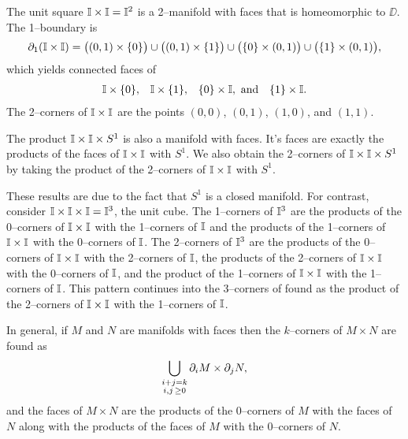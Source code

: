 \begin{ex}
	The unit square $\mathbb{I}\times \mathbb{I}=\mathbb{I}^2$ is a 2--manifold with faces that is homeomorphic to $\DD$.
	The 1--boundary is 
	\[\partial_1(\mathbb{I}\times\mathbb{I}) = \big((0,1)\times\{0\}\big)\cup\big((0,1)\times\{1\}\big)\cup\big(\{0\}\times(0,1)\big)\cup\big(\{1\}\times(0,1)\big),\]
	which yields connected faces of
	\[
		\begin{array}{cccc}
			\mathbb{I}\times\{0\}, & \mathbb{I}\times\{1\}, & \{0\}\times\mathbb{I}, \textmd{ and}&\{1\}\times\mathbb{I}.
		\end{array}
	\]
	The 2--corners of $\mathbb{I}\times\mathbb{I}$ are the points $(0,0)$, $(0,1)$, $(1,0)$, and $(1,1)$.

	The product $\mathbb{I}\times\mathbb{I}\times S^1$ is also a manifold with faces.
	It's faces are exactly the products of the faces of $\mathbb{I}\times\mathbb{I}$ with $S^1$.
	We also obtain the 2--corners of $\mathbb{I}\times\mathbb{I}\times S^1$ by taking the product of the 2--corners of $\mathbb{I}\times\mathbb{I}$ with $S^1$.
	
	These results are due to the fact that $S^1$ is a closed manifold.
	For contrast, consider $\mathbb{I}\times\mathbb{I}\times\mathbb{I}=\mathbb{I}^3$, the unit cube.
	The 1--corners of $\mathbb{I}^3$ are the products of the 0--corners of $\mathbb{I}\times\mathbb{I}$ with the 1--corners of $\mathbb{I}$ and the products of the 1--corners of $\mathbb{I}\times\mathbb{I}$ with the 0--corners of $\mathbb{I}$.
	The 2--corners of $\mathbb{I}^3$ are the products of the 0--corners of $\mathbb{I}\times\mathbb{I}$ with the 2--corners of $\mathbb{I}$, the products of the 2--corners of $\mathbb{I}\times\mathbb{I}$ with the 0--corners of $\mathbb{I}$, and the product of the 1--corners of $\mathbb{I}\times\mathbb{I}$ with the 1--corners of $\mathbb{I}$.
	This pattern continues into the 3--corners of found as the product  of the 2--corners of $\mathbb{I}\times\mathbb{I}$ with the 1--corners of $\mathbb{I}$.
	
	In general, if $M$ and $N$ are manifolds with faces then the $k$--corners of $M\times N$ are found as
	\[
		\bigcup_{\substack{i+j=k\\i,j\,\geq0}} \partial_i M\times \partial_j N,
	\]
	and the faces of $M\times N$ are the products of the 0--corners of $M$ with the faces of $N$ along with the products of the faces of $M$ with the 0--corners of $N$.
\end{ex}



